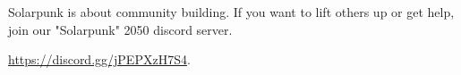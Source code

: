 \newpage

Solarpunk is about community building. If you want to lift others up or get help, join our "Solarpunk" 2050 discord server.

\href{https://discord.gg/jPEPXzH7S4}{https://discord.gg/jPEPXzH7S4}.

